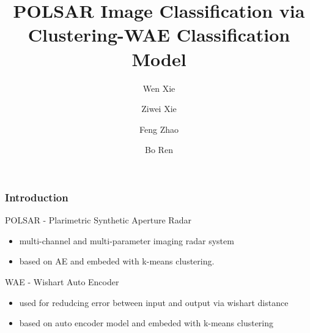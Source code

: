 \documentclass[10pt]{beamer}
\title{POLSAR Image Classification via Clustering-WAE Classification Model}
\author{Wen Xie \and Ziwei Xie \and Feng Zhao \and Bo Ren}
\begin{document}
\frame{\titlepage}

\begin{frame}
\frametitle{Introduction}
POLSAR - Plarimetric Synthetic Aperture Radar \\
\begin{itemize}
\item multi-channel and multi-parameter imaging radar system
\item based on AE and embeded with k-means clustering.
\end{itemize}

WAE - Wishart Auto Encoder

\begin{itemize}
\item used for redudcing error between input and output via wishart distance
\item based on auto encoder model and embeded with k-means clustering
\end{itemize}

\end{frame}
\end{document}
